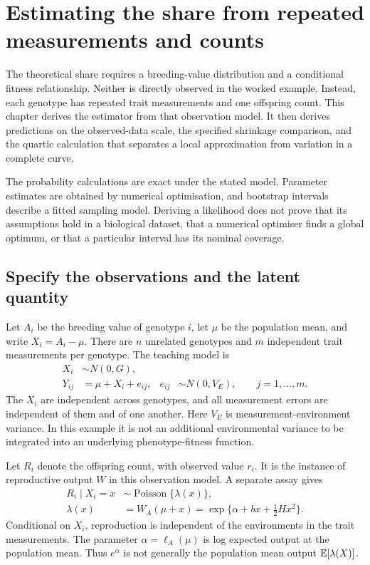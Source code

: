 \chapter{Estimating the share from repeated measurements and counts}
\label{estimation:chapter}

The theoretical share requires a breeding-value distribution and a conditional
fitness relationship. Neither is directly observed in the worked example.
Instead, each genotype has repeated trait measurements and one offspring
count. This chapter derives the estimator from that observation model. It
then derives predictions on the observed-data scale, the specified shrinkage
comparison, and the quartic calculation that separates a local approximation
from variation in a complete curve.

The probability calculations are exact under the stated model. Parameter
estimates are obtained by numerical optimisation, and bootstrap intervals
describe a fitted sampling model. Deriving a likelihood does not prove that its
assumptions hold in a biological dataset, that a numerical optimiser finds a
global optimum, or that a particular interval has its nominal coverage.

\section{Specify the observations and the latent quantity}
\label{estimation:model}

Let \(A_i\) be the breeding value of genotype \(i\), let \(\mu\) be the
population mean, and write \(X_i=A_i-\mu\). There are \(n\) unrelated genotypes
and \(m\) independent trait measurements per genotype. The teaching model is
\begin{align}
 X_i&\sim N(0,G),\nonumber\\
 Y_{ij}&=\mu+X_i+e_{ij},
 & e_{ij}&\sim N(0,V_E),\qquad j=1,\ldots,m.
 \label{estimation:measurement_model}
\end{align}
The \(X_i\) are independent across genotypes, and all measurement errors are
independent of them and of one another. Here \(V_E\) is measurement-environment
variance. In this example it is not an additional environmental variance to be
integrated into an underlying phenotype-fitness function.

Let \(R_i\) denote the offspring count, with observed value \(r_i\). It is the
instance of reproductive output \(W\) in this observation model. A separate
assay gives
\begin{align}
 R_i\mid X_i=x&\sim\operatorname{Poisson}\{\lambda(x)\},\nonumber\\
 \lambda(x)&=W_A(\mu+x)
 =\exp\{\alpha+bx+\tfrac12Hx^2\}.
 \label{estimation:count_model}
\end{align}
Conditional on \(X_i\), reproduction is independent of the environments in the
trait measurements. The parameter \(\alpha=\ell_A(\mu)\) is log expected output
at the population mean. Thus \(e^\alpha\) is not generally the population mean
output \(\mathbb E[\lambda(X)]\).

